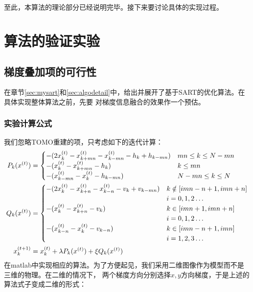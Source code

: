 至此，本算法的理论部分已经说明完毕。接下来要讨论具体的实现过程。





\chapter{算法的验证实验}
\section{梯度叠加项的可行性}
在章节\ref{sec:mysart}和\ref{sec:algodetail}中，给出并展开了基于SART的优化算法。在具体实现整体算法之前，先要
对梯度信息融合的效果作一个预估。
\subsection{实验计算公式}
我们忽略TOMO重建的项，只考虑如下的迭代计算：
\begin{align*}
P_k(x^{(t)}) &= \begin{cases}
                            -(2x_k^{(t)} - x_{k+mn}^{(t)} - x_{k-mn}^{(t)} - h_k + h_{k-mn}) & mn \le k \le N-mn \\
                            -(x_k^{(t)} - x_{k+mn}^{(t)} - h_k) &  k\le mn \\
                            -(x_{k-mn}^{(t)} - x_{k}^{(t)} - h_{k-mn}) &  N-mn \le k \le N
                        \end{cases}   \\
Q_k(x^{(t)}) &= \begin{cases}
                            -(2x_k^{(t)} - x_{k+n}^{(t)} - x_{k-n}^{(t)} - v_k + v_{k-mn}) & k \notin [ imn-n+1, imn+n]
                            \\ &i = 0,1,2\hdots\\
                            -(x_k^{(t)} - x_{k+n}^{(t)} - v_k) & k \in \left[imn+1,imn+n\right] \\ &i = 0,1,2\hdots\\
                            -(x_{k-n}^{(t)} - x_{k}^{(t)} - v_{k-n}) &  k \in [imn-n+1,imn] \\ &i= 1,2,3 \hdots
                        \end{cases}  \\
x_k^{(t+1)}&= x_k^{(t)} + \lambda P_k(x^{(t)}) + \xi Q_k(x^{(t)})
\end{align*}
在matlab中实现相应的算法。为了方便起见，我们采用二维图像作为模型而不是三维的物理。在二维的情况下，
两个梯度方向分别选择$x,y$方向梯度，于是上述的算法式子变成二维的形式：
